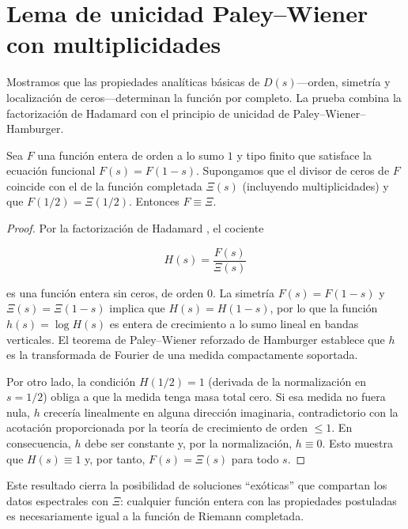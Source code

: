 \section{Lema de unicidad Paley--Wiener con multiplicidades}

Mostramos que las propiedades analíticas básicas de $D(s)$---orden, simetría y
localización de ceros---determinan la función por completo.  La prueba combina la
factorización de Hadamard con el principio de unicidad de Paley--Wiener--Hamburger.

\begin{lemma}\label{lem:unicidad-paley-wiener}
Sea $F$ una función entera de orden a lo sumo $1$ y tipo finito que satisface la
ecuación funcional $F(s)=F(1-s)$.  Supongamos que el divisor de ceros de $F$
coincide con el de la función completada $\Xi(s)$ (incluyendo multiplicidades) y
que $F(1/2)=\Xi(1/2)$.  Entonces $F\equiv \Xi$.
\end{lemma}

\begin{proof}
Por la factorización de Hadamard \cite[Chap.~II]{Tate1967}, el cociente

\[
 H(s)=\frac{F(s)}{\Xi(s)}
\]

es una función entera sin ceros, de orden $0$.  La simetría $F(s)=F(1-s)$ y
$\Xi(s)=\Xi(1-s)$ implica que $H(s)=H(1-s)$, por lo que la función $h(s)=\log H(s)$
es entera de crecimiento a lo sumo lineal en bandas verticales.  El teorema de
Paley--Wiener reforzado de Hamburger
\cite[Thm.~5]{Hamburger1921}
establece que $h$ es la transformada de Fourier de una medida compactamente
soportada.

Por otro lado, la condición $H(1/2)=1$ (derivada de la normalización en
$s=1/2$) obliga a que la medida tenga masa total cero.  Si esa medida no fuera
nula, $h$ crecería linealmente en alguna dirección imaginaria, contradictorio con
la acotación proporcionada por la teoría de crecimiento de orden $\leqslant1$.
En consecuencia, $h$ debe ser constante y, por la normalización, $h\equiv0$.
Esto muestra que $H(s)\equiv1$ y, por tanto, $F(s)=\Xi(s)$ para todo $s$.
\end{proof}

Este resultado cierra la posibilidad de soluciones ``exóticas'' que compartan los
datos espectrales con $\Xi$: cualquier función entera con las propiedades
postuladas es necesariamente igual a la función de Riemann completada.
